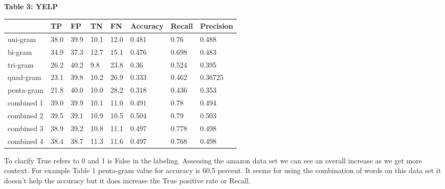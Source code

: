 \documentclass[12pt]{article}
\begin{document}
 \begin{table}[hbt!]


        
\begin{center}
\textbf{Table 3: YELP} \\
\end{center}
\begin{tabular}{l|l|l|l|l|l|l|l|}
            \cline{2-7}
            
            \cline{2-7}
             & TP & FP & TN & FN  & Accuracy & Recall & Precision\\
            \hline
            \multicolumn{1}{|l|}{uni-gram} &  38.0 & 39.9  &10.1 & 12.0  & 0.481 &   0.76   & 0.488 \\
            \hline
            \hline
            \multicolumn{1}{|l|}{bi-gram} & 34.9  & 37.3 & 12.7 & 15.1 & 0.476 & 0.698 & 0.483  \\
            \hline
            \hline
            \multicolumn{1}{|l|}{tri-gram} &26.2 & 40.2 &  9.8 & 23.8 & 0.36 & 0.524 & 0.395 \\
            \hline
            \hline
            \multicolumn{1}{|l|}{quad-gram} & 23.1  & 39.8 & 10.2  & 26.9 & 0.333 & 0.462 & 0.36725 \\
            \hline
            \hline
        
            
            \multicolumn{1}{|l|}{penta-gram} & 21.8  & 40.0 & 10.0 & 28.2 & 0.318 & 0.436 & 0.353    \\
            \hline
            \hline
            
            \multicolumn{1}{|l|}{combined 1}& 39.0 & 39.9 & 10.1  & 11.0 & 0.491 & 0.78 & 0.494 \\
            \hline
            \hline
            \multicolumn{1}{|l|}{combined 2}& 39.5 &  39.1 & 10.9 & 10.5 & 0.504 & 0.79 & 0.503\\
            \hline
            \hline
            \multicolumn{1}{|l|}{combined 3} & 38.9 &  39.2 & 10.8 & 11.1 & 0.497 & 0.778 & 0.498 \\
            \hline
            \hline
            \multicolumn{1}{|l|}{combined 4}& 38.4 &  38.7 & 11.3 & 11.6 & 0.497 & 0.768 & 0.498\\
            \hline
\end{tabular}     
\end{table}

To clarify True refers to 0 and 1 is False in the labeling. Assessing the amazon data set we can see an overall increase as we get more context. For example Table 1 penta-gram value for accuracy is 60.5 percent. It seems for using the combination of words on this data set it doesn't help the accuracy but it does increase the True positive rate or Recall. 
\end{document}
